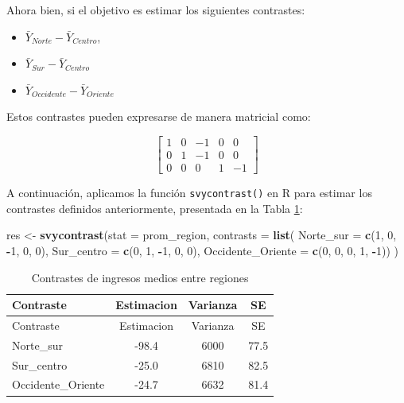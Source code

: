 \documentclass[
  spanish,
  12pt,
]{book}
\newenvironment{Shaded}{\begin{snugshade}}{\end{snugshade}}
\newcommand{\AttributeTok}[1]{\textcolor[rgb]{0.13,0.29,0.53}{#1}}
\newcommand{\DecValTok}[1]{\textcolor[rgb]{0.00,0.00,0.81}{#1}}
\newcommand{\FunctionTok}[1]{\textcolor[rgb]{0.13,0.29,0.53}{\textbf{#1}}}
\newcommand{\NormalTok}[1]{#1}
\newcommand{\OtherTok}[1]{\textcolor[rgb]{0.56,0.35,0.01}{#1}}
\newcommand{\SpecialCharTok}[1]{\textcolor[rgb]{0.81,0.36,0.00}{\textbf{#1}}}
\providecommand{\tightlist}{%
  \setlength{\itemsep}{0pt}\setlength{\parskip}{0pt}}
\begin{document}
Ahora bien, si el objetivo es estimar los siguientes contrastes:

\begin{itemize}
\tightlist
\item
  \(\bar{Y}_{Norte} - \bar{Y}_{Centro}\),
\item
  \(\bar{Y}_{Sur}-\bar{Y}_{Centro}\)
\item
  \(\bar{Y}_{Occidente}-\bar{Y}_{Oriente}\)
\end{itemize}

Estos contrastes pueden expresarse de manera matricial como:

\[
\left[\begin{array}{ccccc}
1 & 0 & -1 & 0 & 0\\
0 & 1 & -1 & 0 & 0\\
0 & 0 & 0 & 1 & -1
\end{array}\right]
\]

A continuación, aplicamos la función \texttt{svycontrast()} en R para estimar los contrastes definidos anteriormente, presentada en la Tabla \ref{tab:tab-contraste-regiones}:

\begin{Shaded}
\begin{Highlighting}[]
\NormalTok{res }\OtherTok{\textless{}{-}} \FunctionTok{svycontrast}\NormalTok{(}\AttributeTok{stat =}\NormalTok{ prom\_region,}
                   \AttributeTok{contrasts =} \FunctionTok{list}\NormalTok{(}
                             \AttributeTok{Norte\_sur         =} \FunctionTok{c}\NormalTok{(}\DecValTok{1}\NormalTok{, }\DecValTok{0}\NormalTok{, }\SpecialCharTok{{-}}\DecValTok{1}\NormalTok{, }\DecValTok{0}\NormalTok{,  }\DecValTok{0}\NormalTok{),}
                             \AttributeTok{Sur\_centro        =} \FunctionTok{c}\NormalTok{(}\DecValTok{0}\NormalTok{, }\DecValTok{1}\NormalTok{, }\SpecialCharTok{{-}}\DecValTok{1}\NormalTok{, }\DecValTok{0}\NormalTok{,  }\DecValTok{0}\NormalTok{),}
                             \AttributeTok{Occidente\_Oriente =} \FunctionTok{c}\NormalTok{(}\DecValTok{0}\NormalTok{, }\DecValTok{0}\NormalTok{,  }\DecValTok{0}\NormalTok{, }\DecValTok{1}\NormalTok{, }\SpecialCharTok{{-}}\DecValTok{1}\NormalTok{))}
\NormalTok{                   )}
\end{Highlighting}
\end{Shaded}

\begin{longtable}[]{@{}lccc@{}}
\caption{\label{tab:tab-contraste-regiones}Contrastes de ingresos medios entre regiones}\tabularnewline
\toprule\noalign{}
Contraste & Estimacion & Varianza & SE \\
\midrule\noalign{}
\endfirsthead
\toprule\noalign{}
Contraste & Estimacion & Varianza & SE \\
\midrule\noalign{}
\endhead
\bottomrule\noalign{}
\endlastfoot
Norte\_sur & -98.4 & 6000 & 77.5 \\
Sur\_centro & -25.0 & 6810 & 82.5 \\
Occidente\_Oriente & -24.7 & 6632 & 81.4 \\
\end{longtable}
\end{document}
